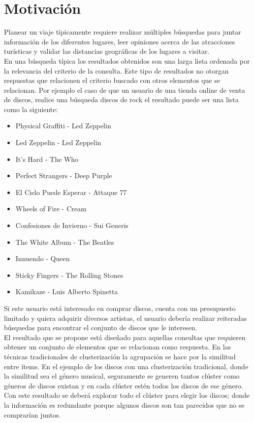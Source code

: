 \section{Motivación}
Planear un viaje típicamente requiere realizar múltiples búsquedas para juntar información de los diferentes lugares, leer opiniones acerca de las atracciones turísticas y validar las distancias geográficas de los lugares a visitar.\\
En una búsqueda típica los resultados obtenidos son una larga lista ordenada por la relevancia del criterio de la consulta. Este tipo de resultados no otorgan respuestas que relacionen el criterio buscado con otros elementos que se relacionan. Por ejemplo el caso de que un usuario de una tienda online de venta de discos, realice una búsqueda discos de rock el resultado puede ser una lista como la siguiente:\\
\begin{itemize}
  \item Physical Graffiti - Led Zeppelin
  \item Led Zeppelin - Led Zeppelin
  \item It's Hard - The Who
  \item Perfect Strangers - Deep Purple
  \item El Cielo Puede Esperar - Attaque 77
  \item Wheels of Fire - Cream
  \item Confesiones de Invierno - Sui Generis
  \item The White Album - The Beatles
  \item Innuendo - Queen
  \item Sticky Fingers - The Rolling Stones
  \item Kamikaze - Luis Alberto Spinetta
\end{itemize}

Si este usuario está interesado en comprar discos, cuenta con un presupuesto limitado y quiera adquirir diversos artistas, el usuario debería realizar reiteradas búsquedas para encontrar el conjunto de discos que le interesen.\\

El resultado que se propone está diseñado para aquellas consultas que requieren obtener un conjunto de elementos que se relacionan como respuesta. En las técnicas tradicionales de clusterización la agrupación se hace por la similitud entre ítems. En el ejemplo de los discos con una clusterización tradicional, donde la similitud sea el género musical, seguramente se generen tantos clúster como géneros de discos existan y en cada clúster estén todos los discos de ese género. Con este resultado se deberá explorar todo el clúster para elegir los discos; donde la información es redundante porque algunos discos son tan parecidos que no se comprarían juntos.\\

